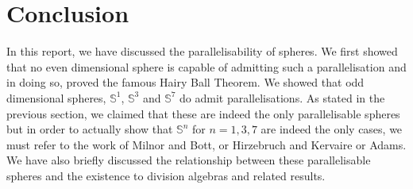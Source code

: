 \documentclass[12pt,a4paper]{article}
\begin{document}
\section{Conclusion}
In this report, we have discussed the parallelisability of spheres. We first showed that no even dimensional sphere is capable of admitting such a parallelisation and in doing so, proved the famous Hairy Ball Theorem. We showed that odd dimensional spheres, $\mathbb{S}^1$, $\mathbb{S}^3$ and $\mathbb{S}^7$ do admit parallelisations. As stated in the previous section, we claimed that these are indeed the only parallelisable spheres but in order to actually show that $\mathbb{S}^n$ for $n=1,3,7$ are indeed the only cases, we must refer to the work of Milnor and Bott, or Hirzebruch and Kervaire or Adams. We have also briefly discussed the relationship between these parallelisable spheres and the existence to division algebras and related results.

\clearpage



\end{document}
